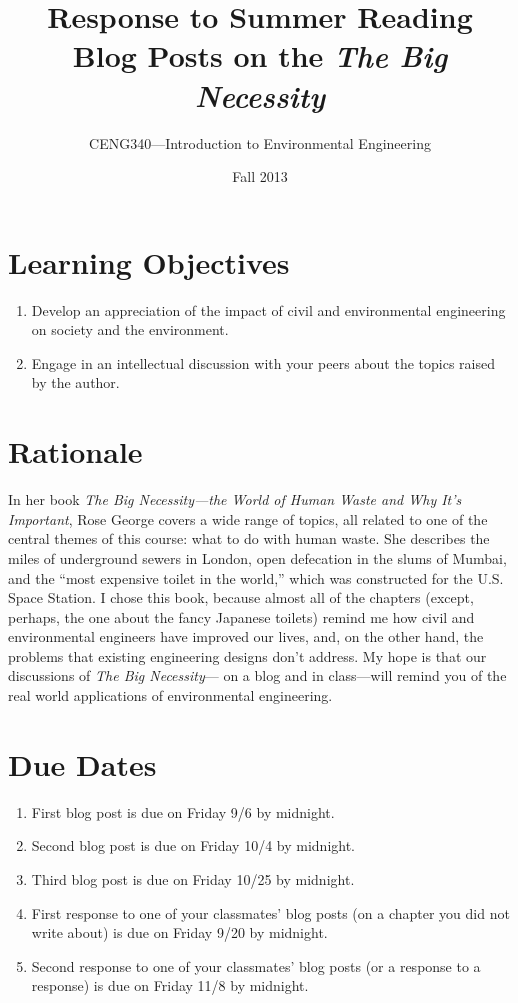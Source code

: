 \documentclass[12pt,letterpaper]{article}
\begin{document}
\setlength{\parindent}{0cm} 


\frenchspacing

\title {Response to Summer Reading \\ \vspace{2 mm} {\large Blog Posts on the \emph{The Big Necessity}}}

\author {CENG340---Introduction to Environmental Engineering}
\date {Fall 2013}
\maketitle

\section *{Learning Objectives}
\begin{enumerate}
\item Develop an appreciation of the impact of civil and environmental engineering on society and the environment.
\item Engage in an intellectual discussion with your peers about the topics raised by the author.
\end{enumerate}

\section *{Rationale}
In her book \emph{The Big Necessity---the World of Human Waste and Why It's Important}, Rose George covers a wide range of topics, all related to one of the central themes of this course: what to do with human waste.  She describes the miles of underground sewers in London, open defecation in the slums of Mumbai, and the ``most expensive toilet in the world,'' which was constructed for the U.S. Space Station.  I chose this book, because almost all of the chapters (except, perhaps, the one about the fancy Japanese toilets) remind me how civil and environmental engineers have improved our lives, and, on the other hand, the problems that existing engineering designs don't address. My hope is that our discussions of \emph{The Big Necessity}--- on a blog and in class---will remind you of the real world applications of environmental engineering.
\section *{Due Dates}

\begin{enumerate}
\item First blog post is due on Friday 9/6 by midnight.
\item Second blog post is due on Friday 10/4 by midnight.
\item Third blog post is due on Friday 10/25 by midnight.
\item First response to one of your classmates' blog posts (on a chapter you did not write about) is due on Friday 9/20 by midnight.
\item Second response to  one of your classmates' blog posts (or a response to a response) is due on Friday 11/8 by midnight.
\end{enumerate}
\end{document}
